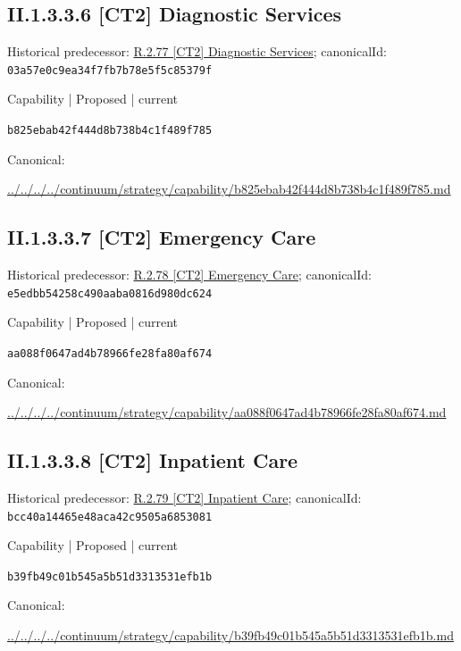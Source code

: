\documentclass[10pt,a4paper]{article}
\begin{document}
\subsection*{II.1.3.3.6 [CT2] Diagnostic Services}
Historical predecessor: \hyperref[element-03a57e0c9ea34f7fb7b78e5f5c85379f]{R.2.77 [CT2] Diagnostic Services}; canonicalId: \texttt{03a57e0c9ea34f7fb7b78e5f5c85379f}\par
\label{element-b825ebab42f444d8b738b4c1f489f785}
{\small Capability | Proposed | current}\par
\texttt{b825ebab42f444d8b738b4c1f489f785}\par
Canonical: \par
{\footnotesize\url{../../../../continuum/strategy/capability/b825ebab42f444d8b738b4c1f489f785.md}}\par
\subsection*{II.1.3.3.7 [CT2] Emergency Care}
Historical predecessor: \hyperref[element-e5edbb54258c490aaba0816d980dc624]{R.2.78 [CT2] Emergency Care}; canonicalId: \texttt{e5edbb54258c490aaba0816d980dc624}\par
\label{element-aa088f0647ad4b78966fe28fa80af674}
{\small Capability | Proposed | current}\par
\texttt{aa088f0647ad4b78966fe28fa80af674}\par
Canonical: \par
{\footnotesize\url{../../../../continuum/strategy/capability/aa088f0647ad4b78966fe28fa80af674.md}}\par
\subsection*{II.1.3.3.8 [CT2] Inpatient Care}
Historical predecessor: \hyperref[element-bcc40a14465e48aca42c9505a6853081]{R.2.79 [CT2] Inpatient Care}; canonicalId: \texttt{bcc40a14465e48aca42c9505a6853081}\par
\label{element-b39fb49c01b545a5b51d3313531efb1b}
{\small Capability | Proposed | current}\par
\texttt{b39fb49c01b545a5b51d3313531efb1b}\par
Canonical: \par
{\footnotesize\url{../../../../continuum/strategy/capability/b39fb49c01b545a5b51d3313531efb1b.md}}\par
\end{document}
